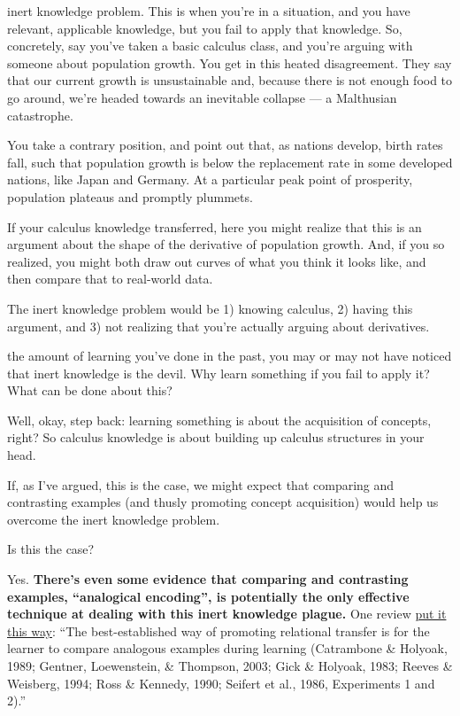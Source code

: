  inert knowledge problem. This is when you're in a
situation, and you have relevant, applicable knowledge, but you fail to
apply that knowledge. So, concretely, say you've taken a basic calculus
class, and you're arguing with someone about population growth. You get
in this heated disagreement. They say that our current growth is
unsustainable and, because there is not enough food to go around, we're headed
towards an inevitable collapse --- a Malthusian catastrophe.

You take a contrary position, and point out that, as nations develop,
birth rates fall, such that population growth is below the replacement
rate in some developed nations, like Japan and Germany. At a particular peak
point of prosperity, population plateaus and promptly plummets.

If your calculus knowledge transferred, here you might realize that this
is an argument about the shape of the derivative of population growth.
And, if you so realized, you might both draw out curves of what you
think it looks like, and then compare that to real-world data.

The inert knowledge problem would be 1) knowing calculus, 2) having this
argument, and 3) not realizing that you're actually arguing about
derivatives.

 the amount of learning you've done in the past, you
may or may not have noticed that inert knowledge is the devil. Why learn
something if you fail to apply it? What can be done about this?

Well, okay, step back: learning something is about the acquisition of concepts,
right? So calculus knowledge is about building up calculus structures in
your head.

If, as I've argued, this is the case, we might expect that comparing and
contrasting examples (and thusly promoting concept acquisition) would
help us overcome the inert knowledge problem.

Is this the case?

Yes. \textbf{There's even some evidence that comparing and contrasting
examples, ``analogical encoding'', is potentially the only effective
technique at dealing with this inert knowledge plague.} One review
\href{http://onlinelibrary.wiley.com/doi/10.1111/j.1551-6709.2009.01070.x/full}{put
it this way}: ``The best-established way of promoting relational
transfer is for the learner to compare analogous examples during
learning (Catrambone \& Holyoak, 1989; Gentner, Loewenstein, \&
Thompson, 2003; Gick \& Holyoak, 1983; Reeves \& Weisberg, 1994; Ross \&
Kennedy, 1990; Seifert et al., 1986, Experiments 1 and 2).''

